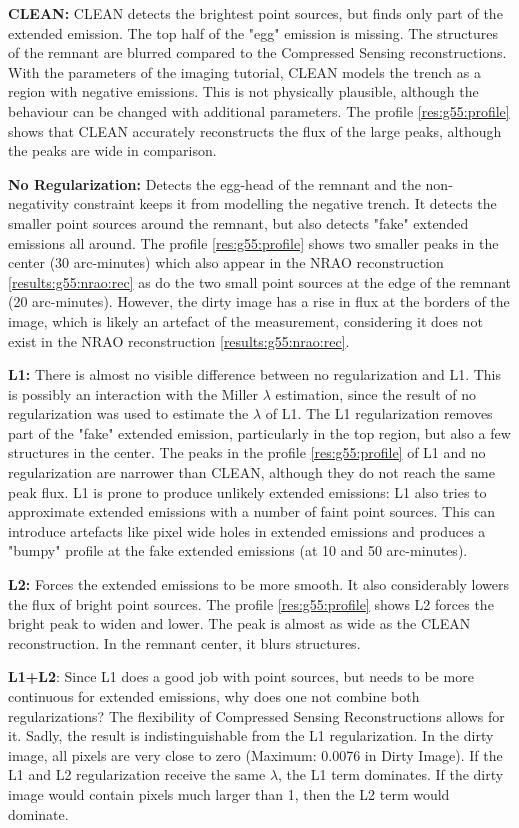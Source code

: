 \textbf{CLEAN:} CLEAN detects the brightest point sources, but finds only part of the extended emission. The top half of the "egg" emission is missing. The structures of the remnant are blurred compared to the Compressed Sensing reconstructions. With the parameters of the imaging tutorial, CLEAN models the trench as a region with negative emissions. This is not physically plausible, although the behaviour can be changed with additional parameters. The profile \ref{res:g55:profile} shows that CLEAN accurately reconstructs the flux of the large peaks, although the peaks are wide in comparison.

\textbf{No Regularization:} Detects the egg-head of the remnant and the non-negativity constraint keeps it from modelling the negative trench. It detects the smaller point sources around the remnant, but also detects "fake" extended emissions all around. The profile \ref{res:g55:profile}  shows two smaller peaks in the center (30 arc-minutes) which also appear in the NRAO reconstruction \ref{results:g55:nrao:rec} as do the two small point sources at the edge of the remnant (20 arc-minutes). However, the dirty image has a rise in flux at the borders of the image, which is likely an artefact of the measurement, considering it does not exist in the NRAO reconstruction \ref{results:g55:nrao:rec}.

\textbf{L1:} There is almost no visible difference between no regularization and L1. This is possibly an interaction with the Miller $\lambda$ estimation, since the result of no regularization was used to estimate the $\lambda$ of L1. The L1 regularization removes part of the "fake" extended emission, particularly in the top region, but also a few structures in the center. The peaks in the profile \ref{res:g55:profile} of L1 and no regularization are narrower than CLEAN, although they do not reach the same peak flux. L1 is prone to produce unlikely extended emissions: L1 also tries to approximate extended emissions with a number of faint point sources. This can introduce artefacts like pixel wide holes in extended emissions and produces a "bumpy" profile at the fake extended emissions (at 10 and 50 arc-minutes).

\textbf{L2:} Forces the extended emissions to be more smooth. It also considerably lowers the flux of bright point sources. The profile \ref{res:g55:profile} shows L2 forces the bright peak to widen and lower. The peak is almost as wide as the CLEAN reconstruction. In the remnant center, it blurs structures.

\textbf{L1+L2}: Since L1 does a good job with point sources, but needs to be more continuous for extended emissions, why does one not combine both regularizations? The flexibility of Compressed Sensing Reconstructions allows for it. Sadly, the result is indistinguishable from the L1 regularization. In the dirty image, all pixels are very close to zero (Maximum: 0.0076 in Dirty Image). If the L1 and L2 regularization receive the same $\lambda$, the L1 term dominates. If the dirty image would contain pixels much larger than 1, then the L2 term would dominate.

